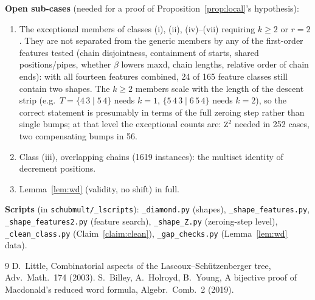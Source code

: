 \documentclass{amsart}
\theoremstyle{definition}
\theoremstyle{remark}
\newcommand{\maxd}{\mathrm{maxd}}
\newcommand{\zeromap}{\mathtt{Z}}
\begin{document}
\medskip
\noindent\textbf{Open sub-cases} (needed for a proof of Proposition~\ref{prop:local}'s hypothesis):
\begin{enumerate}
\item The exceptional members of classes (i), (ii), (iv)--(vii) requiring $k\geq2$ or $r=2$. They are not separated from the generic members by any of the first-order features tested (chain disjointness, containment of starts, shared positions/pipes, whether $\beta$ lowers $\maxd$, chain lengths, relative order of chain ends): with all fourteen features combined, 24 of 165 feature classes still contain two shapes. The $k\geq2$ members scale with the length of the descent strip (e.g.\ $T=\{4\,3\mid 5\,4\}$ needs $k=1$, $\{5\,4\,3\mid 6\,5\,4\}$ needs $k=2$), so the correct statement is presumably in terms of the full zeroing step rather than single bumps; at that level the exceptional counts are: $\zeromap^2$ needed in 252 cases, two compensating bumps in 56.
\item Class (iii), overlapping chains (1619 instances): the multiset identity of decrement positions.
\item Lemma~\ref{lem:wd} (validity, no shift) in full.
\end{enumerate}

\medskip
\noindent\textbf{Scripts} (in \texttt{schubmult/\_lscripts}): \texttt{\_diamond.py} (shapes), \texttt{\_shape\_features.py}, \texttt{\_shape\_features2.py} (feature search), \texttt{\_shape\_Z.py} (zeroing-step level), \texttt{\_clean\_class.py} (Claim~\ref{claim:clean}), \texttt{\_gap\_checks.py} (Lemma~\ref{lem:wd} data).

\begin{thebibliography}{9}
 D.~Little, Combinatorial aspects of the Lascoux--Sch\"utzenberger tree, Adv.\ Math.\ 174 (2003).
 S.~Billey, A.~Holroyd, B.~Young, A bijective proof of Macdonald's reduced word formula, Algebr.\ Comb.\ 2 (2019).
\end{thebibliography}
\end{document}
